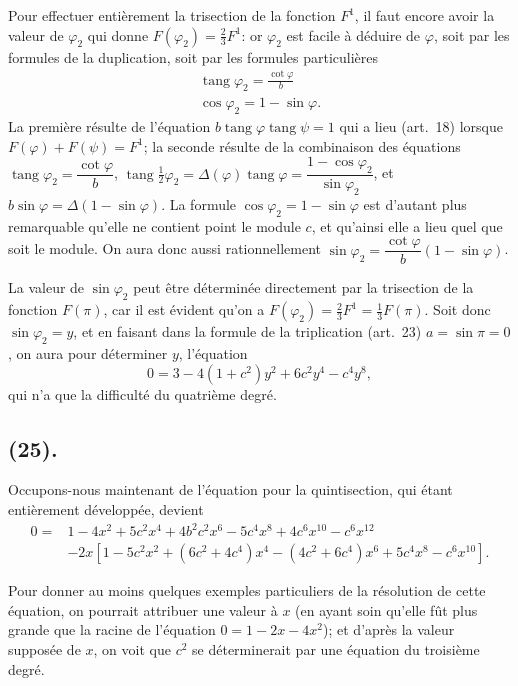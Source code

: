 \documentclass{article}
\begin{document}
Pour effectuer entièrement la trisection de la fonction $F^{1}$, il faut encore avoir la valeur de $\varphi_{2}$ qui donne $F(\varphi_{2})=\frac{2}{3}F^{1}$: or $\varphi_{2}$ est facile à déduire de $\varphi$, soit par les formules de la duplication, soit par les formules particulières
\[ \begin{gathered} \operatorname{tang}\varphi_{2}=\frac{\cot\varphi}{b} \\ \cos\varphi_{2}=1-\sin\varphi. \end{gathered} \]
La première résulte de l'équation $b\operatorname{tang}\varphi\operatorname{tang}\psi=1$ qui a lieu (art.~18) lorsque $F(\varphi)+F(\psi)=F^{1}$; la seconde résulte de la combinaison des équations $\operatorname{tang}\varphi_{2}=\dfrac{\cot\varphi}{b}$, $\operatorname{tang}\frac{1}{2}\varphi_{2}=\Delta(\varphi)\operatorname{tang}\varphi=\dfrac{1-\cos\varphi_{2}}{\sin\varphi_{2}}$, et $b\sin\varphi=\Delta(1-\sin\varphi)$. La formule $\cos\varphi_{2}=1-\sin\varphi$ est d'autant plus remarquable qu'elle ne contient point le module $c$, et qu'ainsi elle a lieu quel que soit le module. On aura donc aussi rationnellement $\sin\varphi_{2}=\dfrac{\cot\varphi}{b}(1-\sin\varphi)$.

La valeur de $\sin\varphi_{2}$ peut être déterminée directement par la trisection de la fonction $F(\pi)$, car il est évident qu'on a $F(\varphi_{2})=\frac{2}{3}F^{1}=\frac{1}{3}F(\pi)$. Soit donc $\sin\varphi_{2}=y$, et en faisant dans la formule de la triplication (art.~23) $a=\sin\pi=0$, on aura pour déterminer $y$, l'équation
\[ 0=3-4(1+c^{2})y^{2}+6c^{2}y^{4}-c^{4}y^{8}, \]
qui n'a que la difficulté du quatrième degré.

\subsection*{(25).}

Occupons-nous maintenant de l'équation pour la quintisection, qui étant entièrement développée, devient
\[ \begin{aligned} 0={}&1-4x^{2}+5c^{2}x^{4}+4b^{2}c^{2}x^{6}-5c^{4}x^{8}+4c^{6}x^{10}-c^{6}x^{12} \\ &-2x[1-5c^{2}x^{2}+(6c^{2}+4c^{4})x^{4}-(4c^{2}+6c^{4})x^{6}+5c^{4}x^{8}-c^{6}x^{10}]. \end{aligned} \]

Pour donner au moins quelques exemples particuliers de la résolution de cette équation, on pourrait attribuer une valeur à $x$ (en ayant soin qu'elle fût plus grande que la racine de l'équation $0=1-2x-4x^{2}$); et d'après la valeur supposée de $x$, on voit que $c^{2}$ se déterminerait par une équation du troisième degré.
\end{document}
